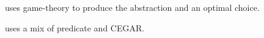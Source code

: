 \cite{Abate2010,Amin2006,Hahn2011,Hofbaur2002,Julius2009,Kattenbelt2009,Soudjani2011a,Bujorianu2004,Koutsoukos2006,Hu2000,Prandini2006}

\cite{Hahn2011} uses game-theory to produce the abstraction and an optimal choice.

\cite{Kattenbelt2009} uses a mix of predicate and CEGAR.
